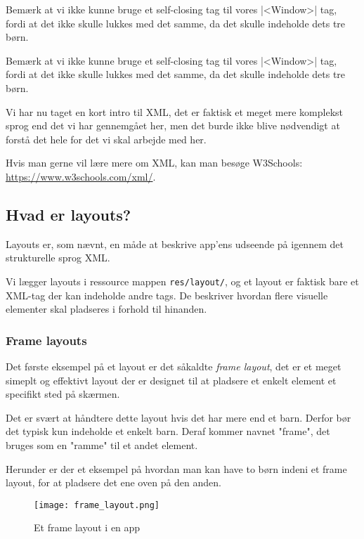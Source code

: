 \begin{remark}
	Bemærk at vi ikke kunne bruge et self-closing tag til vores \XmlInline|<Window>| tag, fordi at det ikke skulle lukkes med det samme, da det skulle indeholde dets tre børn.
\end{remark}

Bemærk at vi ikke kunne bruge et self-closing tag til vores \XmlInline|<Window>| tag, fordi at det ikke skulle lukkes med det samme, da det skulle indeholde dets tre børn.

Vi har nu taget en kort intro til XML, det er faktisk et meget mere komplekst sprog end det vi har gennemgået her, men det burde ikke blive nødvendigt at forstå det hele for det vi skal arbejde med her.

Hvis man gerne vil lære mere om XML, kan man besøge W3Schools: \url{https://www.w3schools.com/xml/}.


\subsection{Hvad er layouts?}
Layouts er, som nævnt, en måde at beskrive app'ens udseende på igennem det strukturelle sprog XML.

Vi lægger layouts i ressource mappen \texttt{res/layout/}, og et layout er faktisk bare et XML-tag der kan indeholde andre tags. De beskriver hvordan flere visuelle elementer skal pladseres i forhold til hinanden.

\subsubsection{Frame layouts}

Det første eksempel på et layout er det såkaldte \textit{frame layout}, det er et meget simeplt og effektivt layout der er designet til at pladsere et enkelt element et specifikt sted på skærmen.

Det er svært at håndtere dette layout hvis det har mere end et barn. Derfor bør det typisk kun indeholde et enkelt barn. Deraf kommer navnet "frame", det bruges som en "ramme" til et andet element.

Herunder er der et eksempel på hvordan man kan have to børn indeni et frame layout, for at pladsere det ene oven på den anden.

\begin{figure}[H]
	\begin{center}
		\texttt{[image: frame\_layout.png]}
		\caption{Et frame layout i en app}
		\label{fig:android:layouts:frame-layout}
	\end{center}
\end{figure}

